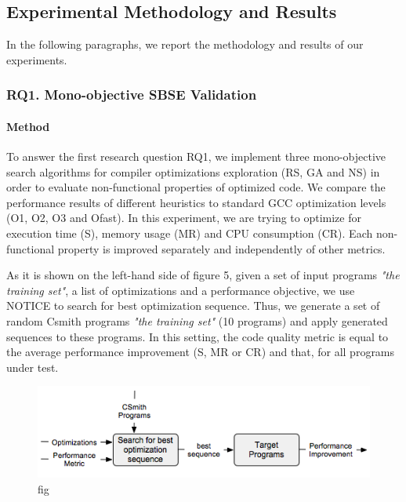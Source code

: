 \subsection{Experimental Methodology and Results}
In the following paragraphs, we report the methodology and results of our experiments.

\subsubsection{RQ1. Mono-objective SBSE Validation}
\paragraph{Method}
To answer the first research question RQ1, we implement three mono-objective search algorithms for compiler optimizations exploration (RS, GA and NS) in order to evaluate non-functional properties of optimized code. We compare the performance results of different heuristics to standard GCC optimization levels (O1, O2, O3 and Ofast). 
In this experiment, we are trying to optimize for execution time (S), memory usage (MR) and CPU consumption (CR). Each non-functional property is improved separately and independently of other metrics. 

As it is shown on the left-hand side of figure 5, given a set of input programs \textit{"the training set"}, a list of optimizations and a performance objective, we use NOTICE to search for best optimization sequence. Thus, we generate a set of random Csmith programs \textit{"the training set"} (10 programs) and apply generated sequences to these programs. In this setting, the code quality metric is equal to the average performance improvement (S, MR or CR) and that, for all programs under test.







\begin{figure}[h]
	\centering
	\includegraphics[width=1.\linewidth]{Ressources/sensitivity.png}
	\caption{fig}
\end{figure}


